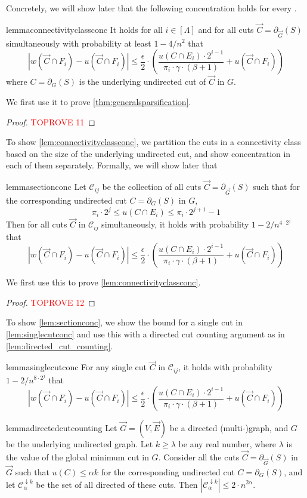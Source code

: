 \documentclass[11pt,a4paper]{article}
\newcommand{\abs}[1]{\ensuremath{\left| #1 \right|}}
\newcommand{\eps}{\epsilon}
\newcommand{\bound}{\abs{w(\vec{C} \cap F_i) - u(\vec{C} \cap F_i)} \le \frac{\eps}{2} \cdot \left( \frac{u(C \cap E_i) \cdot 2^{i-1}}{\pi_i \cdot \gamma \cdot (\beta+1)} + u(\vec{C} \cap F_i) \right)}
\begin{document}
Concretely, we will show later that the following concentration holds for every \connectivityclass.

\begin{restatable}{lemma}{connectivityclassconc}
\label{lem:connectivityclassconc}
It holds for all $i \in [\Lambda]$ and for all cuts $\vec{C} = \partial_{\vec{G}}(S)$ simultaneously with probability at least $1 - 4/n^2$ that
\[
\bound
\]
where $C = \partial_G(S)$ is the underlying undirected cut of $\vec{C}$ in $G$.
\end{restatable}

We first use it to prove \cref{thm:generalsparsification}.

\begin{proof}\textcolor{red}{TOPROVE 11}\end{proof}

To show \cref{lem:connectivityclassconc}, we partition the cuts in a connectivity class based on the size of the underlying undirected cut, and show concentration in each of them separately. Formally, we will show later that
\begin{restatable}{lemma}{sectionconc}
\label{lem:sectionconc}
Let $\mathcal C_{ij}$ be the collection of all cuts $\vec{C} = \partial_{\vec{G}}(S)$ such that for the corresponding undirected cut $C = \partial_G(S)$ in $G$,
\[
\pi_i \cdot 2^j \le u(C \cap E_i) \le \pi_i \cdot 2^{j+1} - 1
\]
Then for all cuts $\vec{C}$ in $\mathcal C_{ij}$ simultaneously, it holds with probability $1 - 2/n^{4 \cdot 2^j}$ that
\[
\bound
\]
\end{restatable}

We first use this to prove \cref{lem:connectivityclassconc}.

\connectivityclassconc*

\begin{proof}\textcolor{red}{TOPROVE 12}\end{proof}

To show \cref{lem:sectionconc}, we show the bound for a single cut in \cref{lem:singlecutconc} and use this with a directed cut counting argument as in \cref{lem:directed_cut_counting}.

\begin{restatable}{lemma}{singlecutconc}
\label{lem:singlecutconc}
For any single cut $\vec{C}$ in $\mathcal C_{ij}$, it holds with probability $1 - 2/n^{8 \cdot 2^j}$ that
\[
\bound
\]
\end{restatable}

\begin{restatable}{lemma}{directedcutcounting}
\label{lem:directed_cut_counting}
Let $\vec{G} = (V, \vec{E})$ be a directed (multi-)graph, and $G$ be the underlying undirected graph. Let $k \ge \lambda$ be any real number, where $\lambda$ is the value of the global minimum cut in $G$. Consider all the cuts $\vec{C} = \partial_{\vec{G}}(S)$ in $\vec{G}$ such that $u(C) \le \alpha k$ for the corresponding undirected cut $C = \partial_G(S)$, and let $\mathcal C^{\downarrow k}_\alpha$ be the set of all directed \kprojection of these cuts. Then $|\mathcal C^{\downarrow k}_\alpha| \le 2 \cdot n^{2\alpha}$.
\end{restatable}
\end{document}
